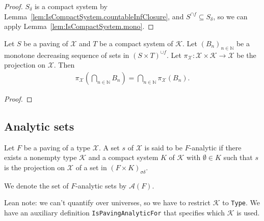 \begin{proof}
$S_\delta$ is a compact system by Lemma~\ref{lem:IsCompactSystem.countableInfClosure}, and $S^{\cap f} \subseteq S_\delta$, so we can apply Lemma~\ref{lem:IsCompactSystem.mono}.
\end{proof}


\begin{theorem}\label{thm:fst_iInter_of_supClosure_memProd_of_antitone}
  \leanok
Let $S$ be a paving of $\mathcal{X}$ and $T$ be a compact system of $\mathcal{K}$.
Let $(B_n)_{n \in \mathbb{N}}$ be a monotone decreasing sequence of sets in $(S \times T)^{\cup f}$.
Let $\pi_{\mathcal{X}} : \mathcal{X} \times \mathcal{K} \to \mathcal{X}$ be the projection on $\mathcal{X}$.
Then
\begin{align*}
  \pi_{\mathcal{X}}\left(\bigcap_{n\in\mathbb{N}} B_n\right) = \bigcap_{n\in\mathbb{N}} \pi_{\mathcal{X}}(B_n).
\end{align*}
\end{theorem}

\begin{proof}\leanok

\end{proof}




\subsection{Analytic sets}

\begin{definition}\label{def:IsPavingAnalytic}
  \leanok
Let $F$ be a paving of a type $\mathcal{X}$.
A set $s$ of $\mathcal{X}$ is said to be $F$-analytic if there exists a nonempty type $\mathcal{K}$ and a compact system $K$ of $\mathcal{K}$ with $\emptyset \in K$ such that $s$ is the projection on $\mathcal{X}$ of a set in $(F \times K)_{\sigma \delta}$.

We denote the set of $F$-analytic sets by $\mathcal{A}(F)$.
\end{definition}

Lean note: we can't quantify over universes, so we have to restrict $\mathcal{K}$ to \texttt{Type}. We have an auxiliary definition \texttt{IsPavingAnalyticFor} that specifies which $\mathcal{K}$ is used.


